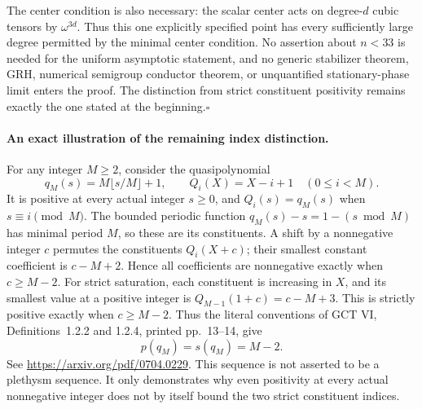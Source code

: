 The center condition is also necessary: the scalar center
acts on degree-$d$ cubic tensors by $\omega^{3d}$.
Thus this one explicitly specified point has every
sufficiently large degree permitted by the minimal center
condition. No assertion about $n<33$ is needed for the
uniform asymptotic statement, and no generic stabilizer
theorem, GRH, numerical semigroup conductor theorem, or
unquantified stationary-phase limit enters the proof.
The distinction from strict constituent positivity remains
exactly the one stated at the beginning.\hfill$\square$

\paragraph{An exact illustration of the remaining index distinction.}
For any integer $M\ge2$, consider the quasipolynomial
\[
 q_M(s)=M\lfloor s/M\rfloor+1,
 \qquad Q_i(X)=X-i+1\quad(0\le i<M).                       \tag{P-F54t}
\]
It is positive at every actual integer $s\ge0$, and
$Q_i(s)=q_M(s)$ when $s\equiv i\pmod M$.
The bounded periodic function $q_M(s)-s=1-(s\bmod M)$
has minimal period $M$, so these are its constituents.
A shift by a nonnegative integer $c$ permutes the
constituents $Q_i(X+c)$; their smallest constant
coefficient is $c-M+2$. Hence all coefficients are
nonnegative exactly when $c\ge M-2$.
For strict saturation, each constituent is increasing
in $X$, and its smallest value at a positive integer
is $Q_{M-1}(1+c)=c-M+3$. This is strictly positive
exactly when $c\ge M-2$. Thus the literal conventions
of GCT VI, Definitions~1.2.2 and 1.2.4, printed
pp.~13--14, give
\[
                   p(q_M)=s(q_M)=M-2.                    \tag{P-F54u}
\]
See \url{https://arxiv.org/pdf/0704.0229}.
This sequence is not asserted to be a plethysm sequence.
It only demonstrates why even positivity at every actual
nonnegative integer does not by itself bound the two
strict constituent indices.
